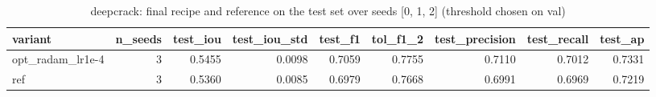\begin{table}
\caption{deepcrack: final recipe and reference on the test set over seeds [0, 1, 2] (threshold chosen on val)}
\label{tab:ablation_deepcrack_test}
\begin{tabular}{lrrrrrrrr}
\toprule
variant & n\_seeds & test\_iou & test\_iou\_std & test\_f1 & tol\_f1\_2 & test\_precision & test\_recall & test\_ap \\
\midrule
opt\_radam\_lr1e-4 & 3 & 0.5455 & 0.0098 & 0.7059 & 0.7755 & 0.7110 & 0.7012 & 0.7331 \\
ref & 3 & 0.5360 & 0.0085 & 0.6979 & 0.7668 & 0.6991 & 0.6969 & 0.7219 \\
\bottomrule
\end{tabular}
\end{table}
